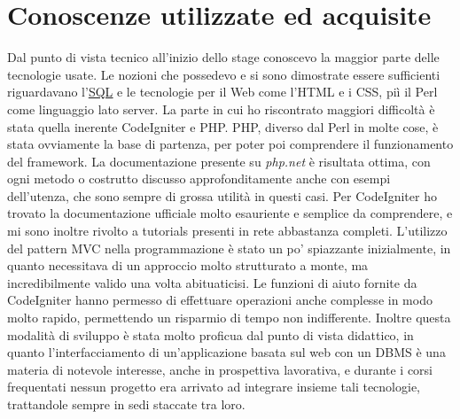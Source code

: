 \section{Conoscenze utilizzate ed acquisite}
Dal punto di vista tecnico all'inizio dello stage conoscevo la maggior parte delle tecnologie usate. Le nozioni che possedevo e si sono dimostrate essere sufficienti riguardavano l'\hyperlink{sql}{\underline{SQL}} e  le tecnologie per il Web come l'HTML e i CSS, pi\`i il Perl come linguaggio lato server. La parte in cui ho riscontrato maggiori difficolt\`a \`e stata quella inerente CodeIgniter e PHP. 
PHP, diverso dal Perl in molte cose, \`e stata ovviamente la base di partenza, per poter poi comprendere il funzionamento del framework. La documentazione presente su \textit{php.net} \`e risultata ottima, con ogni metodo o costrutto discusso approfonditamente anche con esempi dell'utenza, che sono sempre di grossa utilit\`a in questi casi. 
Per CodeIgniter ho trovato la documentazione ufficiale molto esauriente e semplice da comprendere, e mi sono inoltre rivolto a tutorials presenti in rete abbastanza completi. L'utilizzo del pattern MVC nella programmazione \`e stato un po' spiazzante inizialmente, in quanto necessitava di un approccio molto strutturato a monte, ma incredibilmente valido una volta abituaticisi. Le funzioni di aiuto fornite da CodeIgniter hanno permesso di effettuare operazioni anche complesse in modo molto rapido, permettendo un risparmio di tempo non indifferente. Inoltre questa modalit\`a di sviluppo \`e stata molto proficua dal punto di vista didattico, in quanto l'interfacciamento di un'applicazione basata sul web con un DBMS \`e una materia di notevole interesse, anche in prospettiva lavorativa, e durante i corsi frequentati nessun progetto era arrivato ad integrare insieme tali tecnologie, trattandole sempre in sedi staccate tra loro. 

